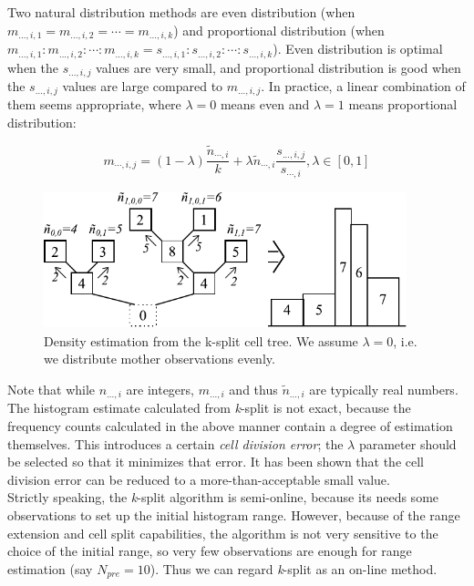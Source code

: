 Two natural distribution methods are even
distribution (when $m_{...,i,1} = m_{...,i,2}
= \cdots = m_{...,i,k}$) and proportional
distribution (when $m_{...,i,1} :
m_{...,i,2} : \cdots : m_{...,i,k} = s_{...,i,1} : s_{...,i,2} :
\cdots : s_{...,i,k}$). Even distribution is optimal when the
$s_{...,i,j}$ values are very small, and proportional distribution is
good when the $s_{...,i,j}$ values are large compared to
$m_{...,i,j}$. In practice, a linear combination of them seems
appropriate, where $\lambda=0$ means even and $\lambda=1$ means
proportional distribution:


\begin{equation}
m_{\cdots,i,j}=(1-\lambda )\frac{\tilde{n}_{\cdots,i}}{k} + \lambda \tilde{n}_{\cdots,i} \frac{s_{...,i,j}}{s_{\cdots,i}}, {\lambda}\in[0,1]
\end{equation}

\begin{figure}[htbp]
  \begin{center}
    \includegraphics[width=4.147in, height=1.567in]{figures/usmanFig16}
    \caption{Density estimation from the k-split cell tree. We 
      assume $\lambda=0$, i.e. we distribute mother observations
      evenly.}
  \end{center}
\end{figure}

Note that while $n_{...,i}$ are integers, $m_{...,i}$ and thus
$\tilde{n}_{...,i}$ are typically real numbers. The histogram estimate
calculated from \textit{k}-split is not exact, because the frequency
counts calculated in the above manner contain a degree of estimation
themselves. This introduces a certain \textit{cell division error};
the $\lambda$ parameter should be selected so that it minimizes that
error. It has been shown that the cell division error can
be reduced to a more-than-acceptable small value.\\
Strictly speaking, the \textit{k}-split algorithm is semi-online,
because its needs some observations to set up the initial histogram
range.  However, because of the range extension and cell split
capabilities, the algorithm is not very sensitive to the choice of the
initial range, so very few observations are enough for range
estimation (say $N_{pre}=10$). Thus we can regard \textit{k}-split as
an on-line method.

